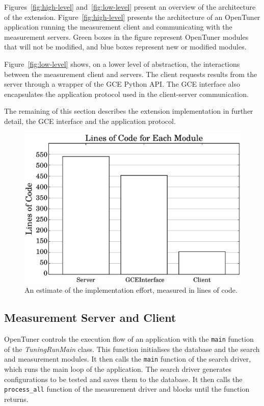 \documentclass[12pt]{article}
\begin{document}
Figures~\ref{fig:high-level} and~\ref{fig:low-level} present an
overview of the architecture of the extension.
Figure~\ref{fig:high-level} presents the architecture of an OpenTuner
application running the measurement client and communicating with the
measurement servers.  Green boxes in the figure represent OpenTuner modules
that will not be modified, and blue boxes represent new or modified modules.

Figure~\ref{fig:low-level} shows, on a lower level of abstraction, the
interactions between the measurement client and servers. The client
requests results from the server through a wrapper of the GCE Python API.
The GCE interface also encapsulates the application protocol used in
the client-server communication.

The remaining of this section describes the extension implementation in further
detail, the GCE interface and the application protocol.

\begin{figure}[htpb]
    \centering
    \includegraphics[scale=.35]{loc_comparison}
    \caption{An estimate of the implementation effort, measured in lines of code.}
    \label{fig:loc-comp}
\end{figure}

\subsection{Measurement Server and Client}
\label{sec:server-client}

OpenTuner controls the execution flow of an application with the
\texttt{\footnotesize main} function of the \emph{TuningRunMain} class. This
function initialises the database and the search and measurement modules. It
then calls the \texttt{\footnotesize main} function of the search driver, which
runs the main loop of the application.  The search driver generates
configurations to be tested and saves them to the database. It then calls the
\texttt{\footnotesize process\_all} function of the measurement driver and
blocks until the function returns.
\end{document}
